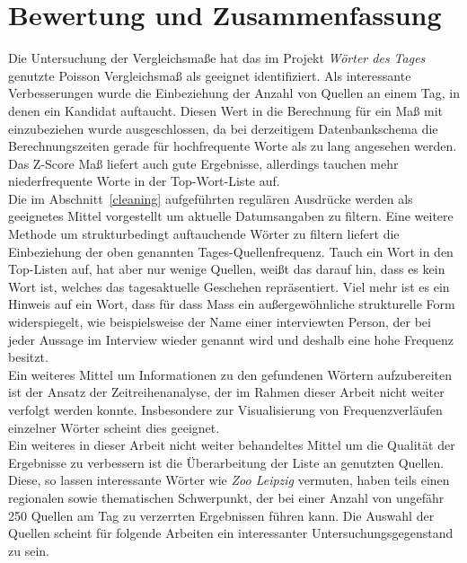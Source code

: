 \chapter{Bewertung und Zusammenfassung}\label{schluss}
Die Untersuchung der Vergleichsmaße hat das im Projekt \emph{Wörter des Tages} genutzte Poisson Vergleichsmaß als geeignet identifiziert. Als interessante Verbesserungen wurde die Einbeziehung der Anzahl von Quellen an einem Tag, in denen ein Kandidat auftaucht. Diesen Wert in die Berechnung für ein Maß mit einzubeziehen wurde ausgeschlossen, da bei derzeitigem Datenbankschema die Berechnungszeiten gerade für hochfrequente Worte als zu lang angesehen werden. Das Z-Score Maß liefert auch gute Ergebnisse, allerdings tauchen mehr niederfrequente Worte in der Top-Wort-Liste auf.\\
Die im Abschnitt~\ref{cleaning} aufgeführten regulären Ausdrücke werden als geeignetes Mittel vorgestellt um aktuelle Datumsangaben zu filtern. Eine weitere Methode um strukturbedingt auftauchende Wörter zu filtern liefert die Einbeziehung der oben genannten Tages-Quellenfrequenz. Tauch ein Wort in den Top-Listen auf, hat aber nur wenige Quellen, weißt das darauf hin, dass es kein Wort ist, welches das tagesaktuelle Geschehen repräsentiert. Viel mehr ist es ein Hinweis auf ein Wort, dass für dass Mass ein außergewöhnliche strukturelle Form widerspiegelt, wie beispielsweise der Name einer interviewten Person, der bei jeder Aussage im Interview wieder genannt wird und deshalb eine hohe Frequenz besitzt.\\
Ein weiteres Mittel um Informationen zu den gefundenen Wörtern aufzubereiten ist der Ansatz der Zeitreihenanalyse, der im Rahmen dieser Arbeit nicht weiter verfolgt werden konnte. Insbesondere zur Visualisierung von Frequenzverläufen einzelner Wörter scheint dies geeignet.\\
Ein weiteres in dieser Arbeit nicht weiter behandeltes Mittel um die Qualität der Ergebnisse zu verbessern ist die Überarbeitung der Liste an genutzten Quellen. Diese, so lassen interessante Wörter wie \emph{Zoo Leipzig} vermuten, haben teils einen regionalen sowie thematischen Schwerpunkt, der bei einer Anzahl von ungefähr 250 Quellen am Tag zu verzerrten Ergebnissen führen kann. Die Auswahl der Quellen scheint für folgende Arbeiten ein interessanter Untersuchungsgegenstand zu sein.



 


